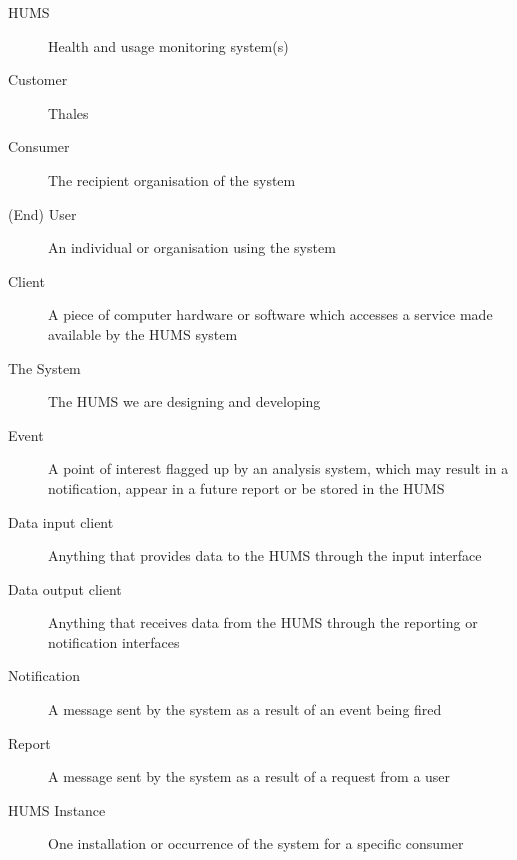 \documentclass[10pt,a4paper]{article}
\begin{document}
\begin{description}
	\item[HUMS] Health and usage monitoring system(s) 
	\item[Customer] Thales 
	\item[Consumer] The recipient organisation of the system 
	\item[(End) User] An individual or organisation using the system 
	\item[Client] A piece of computer hardware or software which accesses a
	              service made available by the HUMS system 
	\item[The System] The HUMS we are designing and developing 
	\item[Event] A point of interest flagged up by an analysis system, which
	             may result in a notification, appear in a future report or be
	             stored in the HUMS 
	\item[Data input client] Anything that provides data to the HUMS through
	                         the input interface 
	\item[Data output client] Anything that receives data from the HUMS
	                          through the reporting or notification
	                          interfaces 
	\item[Notification] A message sent by the system as a result of an event
	                    being fired 
	\item[Report] A message sent by the system as a result of a request from a
	              user 
	\item[HUMS Instance] One installation or occurrence of the system for a
	                     specific consumer 
\end{description}
\end{document}
